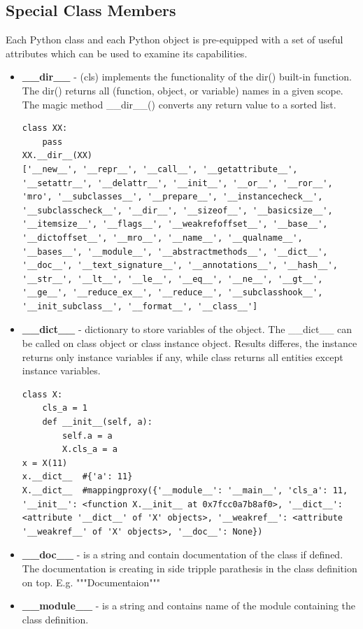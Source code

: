 \documentclass{article}
\begin{document}
\subsection{Special Class Members}
Each Python class and each Python object is pre-equipped with a set of useful attributes which can be used to examine its capabilities.
\begin{itemize}
\item \textbf{\_\_dir\_\_} - (cls) implements the functionality of the dir() built-in function. The dir() returns all (function, object, or variable) names in a given scope. The magic method \_\_dir\_\_() converts any return value to a sorted list.
\begin{lstlisting}[style=pystyle]
class XX:
    pass
XX.__dir__(XX)
['__new__', '__repr__', '__call__', '__getattribute__', '__setattr__', '__delattr__', '__init__', '__or__', '__ror__', 'mro', '__subclasses__', '__prepare__', '__instancecheck__', '__subclasscheck__', '__dir__', '__sizeof__', '__basicsize__', '__itemsize__', '__flags__', '__weakrefoffset__', '__base__', '__dictoffset__', '__mro__', '__name__', '__qualname__', '__bases__', '__module__', '__abstractmethods__', '__dict__', '__doc__', '__text_signature__', '__annotations__', '__hash__', '__str__', '__lt__', '__le__', '__eq__', '__ne__', '__gt__', '__ge__', '__reduce_ex__', '__reduce__', '__subclasshook__', '__init_subclass__', '__format__', '__class__']
\end{lstlisting}
\item \textbf{\_\_dict\_\_} - dictionary to store variables of the object. The \_\_dict\_\_ can be called on class object or class instance object. Results differes, the instance returns only instance variables if any, while class returns all entities except instance variables.
\begin{lstlisting}[style=pystyle]
class X:
    cls_a = 1
    def __init__(self, a):
        self.a = a
        X.cls_a = a
x = X(11)
x.__dict__	#{'a': 11}
X.__dict__	#mappingproxy({'__module__': '__main__', 'cls_a': 11, '__init__': <function X.__init__ at 0x7fcc0a7b8af0>, '__dict__': <attribute '__dict__' of 'X' objects>, '__weakref__': <attribute '__weakref__' of 'X' objects>, '__doc__': None})
\end{lstlisting}
\item \textbf{\_\_doc\_\_} -  is a string and contain documentation of the class if defined. The documentation is creating in side tripple parathesis in the class definition on top. E.g. """Documentaion"""
\item \textbf{\_\_module\_\_} - is a string and contains name of the module containing the class definition.

\end{itemize}
\end{document}
